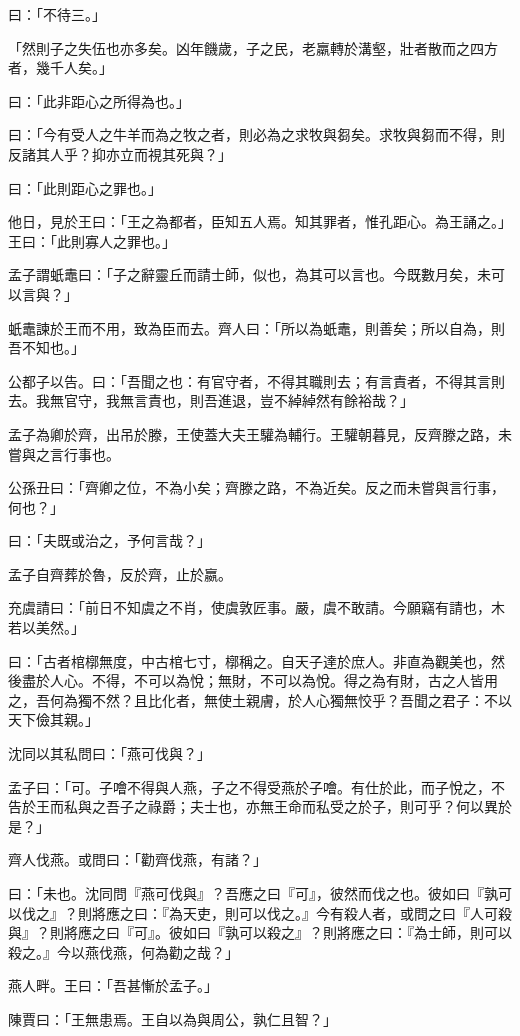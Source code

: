 \begin{pinyinscope}
曰：「不待三。」

「然則子之失伍也亦多矣。凶年饑歲，子之民，老羸轉於溝壑，壯者散而之四方者，幾千人矣。」

曰：「此非距心之所得為也。」

曰：「今有受人之牛羊而為之牧之者，則必為之求牧與芻矣。求牧與芻而不得，則反諸其人乎？抑亦立而視其死與？」

曰：「此則距心之罪也。」

他日，見於王曰：「王之為都者，臣知五人焉。知其罪者，惟孔距心。為王誦之。」王曰：「此則寡人之罪也。」

孟子謂蚔鼃曰：「子之辭靈丘而請士師，似也，為其可以言也。今既數月矣，未可以言與？」

蚔鼃諫於王而不用，致為臣而去。齊人曰：「所以為蚔鼃，則善矣；所以自為，則吾不知也。」

公都子以告。曰：「吾聞之也：有官守者，不得其職則去；有言責者，不得其言則去。我無官守，我無言責也，則吾進退，豈不綽綽然有餘裕哉？」

孟子為卿於齊，出吊於滕，王使蓋大夫王驩為輔行。王驩朝暮見，反齊滕之路，未嘗與之言行事也。

公孫丑曰：「齊卿之位，不為小矣；齊滕之路，不為近矣。反之而未嘗與言行事，何也？」

曰：「夫既或治之，予何言哉？」

孟子自齊葬於魯，反於齊，止於嬴。

充虞請曰：「前日不知虞之不肖，使虞敦匠事。嚴，虞不敢請。今願竊有請也，木若以美然。」

曰：「古者棺槨無度，中古棺七寸，槨稱之。自天子達於庶人。非直為觀美也，然後盡於人心。不得，不可以為悅；無財，不可以為悅。得之為有財，古之人皆用之，吾何為獨不然？且比化者，無使土親膚，於人心獨無恔乎？吾聞之君子：不以天下儉其親。」

沈同以其私問曰：「燕可伐與？」

孟子曰：「可。子噲不得與人燕，子之不得受燕於子噲。有仕於此，而子悅之，不告於王而私與之吾子之祿爵；夫士也，亦無王命而私受之於子，則可乎？何以異於是？」

齊人伐燕。或問曰：「勸齊伐燕，有諸？」

曰：「未也。沈同問『燕可伐與』？吾應之曰『可』，彼然而伐之也。彼如曰『孰可以伐之』？則將應之曰：『為天吏，則可以伐之。』今有殺人者，或問之曰『人可殺與』？則將應之曰『可』。彼如曰『孰可以殺之』？則將應之曰：『為士師，則可以殺之。』今以燕伐燕，何為勸之哉？」

燕人畔。王曰：「吾甚慚於孟子。」

陳賈曰：「王無患焉。王自以為與周公，孰仁且智？」


\end{pinyinscope}
